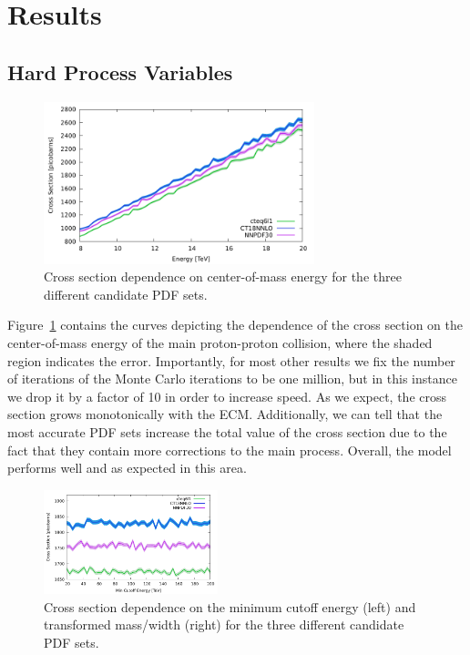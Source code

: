 \section{Results}


\subsection{Hard Process Variables}

\begin{figure}[ht]
  \centering
  \includegraphics[width=0.7\textwidth]{./res/gfx/xs.pdf}
  \caption{Cross section dependence on center-of-mass energy for the three different candidate PDF sets.}
  \label{fig:ecm}
\end{figure}

Figure~\ref{fig:ecm} contains the curves depicting the dependence of the cross section on the center-of-mass energy of the main proton-proton collision, where the shaded region indicates the error. Importantly, for most other results we fix the number of iterations of the Monte Carlo iterations to be one million, but in this instance we drop it by a factor of 10 in order to increase speed. As we expect, the cross section grows monotonically with the ECM. Additionally, we can tell that the most accurate PDF sets increase the total value of the cross section due to the fact that they contain more corrections to the main process. Overall, the model performs well and as expected in this area.


\begin{figure}[ht]
  \centering
  \includegraphics[width=0.45\textwidth]{./res/gfx/cutoff.pdf}
  \caption{Cross section dependence on the minimum cutoff energy (left) and transformed mass/width (right) for the three different candidate PDF sets.}
  \label{fig:cutoff-trans}
\end{figure}

